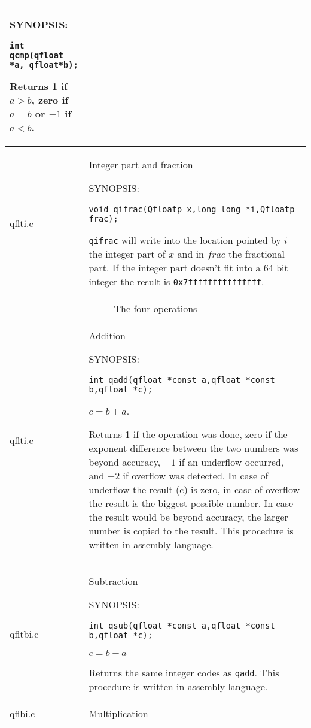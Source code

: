 \documentclass[10pt,a4paper,x11names]{memoir} %
\begin{document}
\begin{longtable}{|p{1.5cm}|p{11.5cm}|}
	{\footnotesize SYNOPSIS:}\vspace{-0.2cm}\index{qcmp}
	\begin{lstlisting}[numbers=none]
		int qcmp(qfloat *a, qfloat*b);
	\end{lstlisting}\vspace{-0.2cm} \par
	Returns 1 if $a> b$, zero if $a = b$ or $-1$ if $a<b$.
	\\\hline
	qflti.c& Integer part and fraction
	
	{\footnotesize SYNOPSIS:}\vspace{-0.2cm}\index{qifrac}
	\begin{lstlisting}[numbers=none]
		void qifrac(Qfloatp x,long long *i,Qfloatp frac);
	\end{lstlisting}\vspace{-0.2cm} \par
	\verb,qifrac, will write into the location pointed by $i$ the integer part of $x$ and in $frac$ the fractional part. If the integer part doesn't fit into a 64 bit integer the result is \verb,0x7fffffffffffffff,.
	\\\hline
	\multicolumn{2}{c}{The four operations}
	\\\hline
	qflti.c& Addition\index{qadd}
	
	{\footnotesize SYNOPSIS:}\vspace{-0.2cm}
	\begin{lstlisting}[numbers=none]
		int qadd(qfloat *const a,qfloat *const b,qfloat *c);
	\end{lstlisting}\vspace{-0.2cm} $ c=b+a$.\par
	Returns 1 if the operation was done, zero if the exponent difference between the two numbers was beyond accuracy, $-1$ if an underflow occurred, and $-2$ if overflow was detected. In case of underflow the result (c) is zero, in case of overflow the result is the biggest possible number. In case the result would be beyond accuracy, the larger number is copied to the result.
	This procedure is written in assembly language.
	\\\hline
	
	qfltbi.c& Subtraction
	
	{\footnotesize SYNOPSIS:}\vspace{-0.2cm}\index{qsub}
	\begin{lstlisting}[numbers=none]
		int qsub(qfloat *const a,qfloat *const b,qfloat *c);
	\end{lstlisting}\vspace{-0.2cm}
	$ c=b-a$\par
	Returns the same integer codes as \verb,qadd,. This procedure is written in assembly language.
	\\\hline
	qflbi.c& Multiplication
	

\end{longtable}
\end{document}

